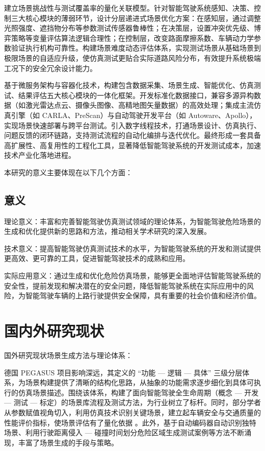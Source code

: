 建立场景挑战性与测试覆盖率的量化关联模型。针对智能驾驶系统感知、决策、控制三大核心模块的薄弱环节，设计分层递进式场景优化方案：在感知层，通过调整光照强度、遮挡物分布等参数测试传感器鲁棒性；在决策层，设置冲突优先级、博弈策略等变量评估算法逻辑合理性；在控制层，改变路面摩擦系数、车辆动力学参数验证执行机构可靠性。构建场景难度动态评估体系，实现测试场景从基础场景到极限场景的自适应升级，使仿真测试更贴合实际道路风险分布，有效提升系统极端工况下的安全冗余设计能力。​​

基于微服务架构与容器化技术，构建包含数据采集、场景生成、智能优化、仿真测试、结果评估五大核心模块的一体化框架。开发标准化数据接口，兼容多源异构数据（如激光雷达点云、摄像头图像、高精地图矢量数据）的高效处理；集成主流仿真引擎（如 CARLA、PreScan）与自动驾驶开发平台（如 Autoware、Apollo），实现场景快速部署与跨平台测试。引入数字线程技术，打通场景设计、仿真执行、问题反馈的闭环链路，支持测试流程的自动化编排与迭代优化。最终形成一套具备高扩展性、高复用性的工程化工具，显著降低智能驾驶系统的开发测试成本，加速技术产业化落地进程。

本研究的意义主要体现在以下几个方面：

\subsection{意义}
理论意义：丰富和完善智能驾驶仿真测试领域的理论体系，为智能驾驶危险场景的生成和优化提供新的思路和方法，推动相关学术研究的深入发展。

技术意义：提高智能驾驶仿真测试技术的水平，为智能驾驶系统的开发和测试提供更高效、更可靠的工具，促进智能驾驶技术的成熟和应用。

实际应用意义：通过生成和优化危险仿真场景，能够更全面地评估智能驾驶系统的安全性，提前发现和解决潜在的安全问题，降低智能驾驶系统在实际应用中的风险，为智能驾驶车辆的上路行驶提供安全保障，具有重要的社会价值和经济价值。

\section{国内外研究现状}

国外研究现状场景生成方法与理论体系：

德国 PEGASUS 项目影响深远，其定义的 “功能 — 逻辑 — 具体” 三级分层体系，为场景构建提供了清晰的结构化思路，从抽象的功能需求逐步细化到具体可执行的仿真场景描述。围绕该体系，构建了面向智能驾驶全生命周期（概念 — 开发 — 测试 — 标定）的场景库流程及测试方法，为行业树立了标杆。同时，部分学者从参数赋值视角切入，利用仿真技术识别关键场景，建立起车辆安全与交通质量的性能评价指标，使场景评估有了量化依据 。此外，基于自动编码器自动识别独特场景、利用行驶距离侵入 — 碰撞时间划分危险区域生成测试案例等方法不断涌现，丰富了场景生成的手段与策略。

